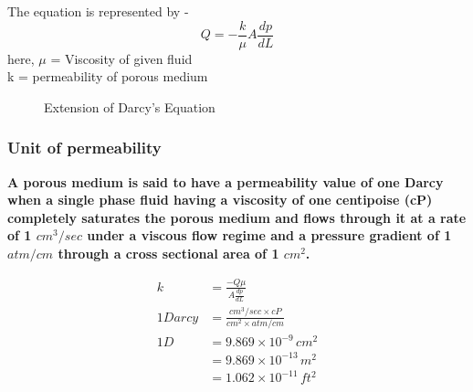 \documentclass{article}
\begin{document}
    The equation is represented by - 
    $$Q = - \frac{k}{\mu} A \dfrac{dp}{dL}$$
    here, $\mu$ = Viscosity of given fluid \\
    k = permeability of porous medium \\ 

    \begin{figure}[h]
        \centering
      
        \hfill
    
        \caption{Extension of Darcy's Equation}
        \label{fig:Extension of Darcy's Equation}
      \end{figure}

      \subsubsection*{Unit of permeability}
      \textbf{A porous medium is said to have a permeability value of one Darcy when a single phase fluid having a viscosity of one centipoise (cP) completely saturates the porous medium and flows through it at a rate of 1 $cm^3/sec$ under a viscous flow regime and a pressure gradient of 1 $atm/cm$ through a cross sectional area of 1 $cm^2$.}

    \begin{align*}
        k &= \frac{- Q \mu}{A \frac{dp}{dL}} \\
        1 Darcy &= \frac{cm^3/sec \times cP}{cm^2 \times atm/cm} \\ 
        1 D &= 9.869 \times 10^{-9} \, cm^2 \\
        &= 9.869 \times 10^{-13} \, m^2 \\
        &= 1.062 \times 10^{-11} \, ft^2 
    \end{align*}
\end{document}
